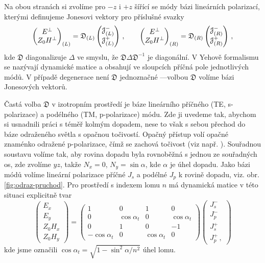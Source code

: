 Na obou stranách si zvolíme pro $-z$ i $+z$ šířící se módy bázi lineárních polarizací, kterými definujeme Jonesovi vektory pro příslušné svazky
\begin{equation}
    \begin{pmatrix} E^\perp \\ Z_0 H^\perp \end{pmatrix}_{(L)}=\mathfrak{D}_{(L)} \begin{pmatrix} \mathcal{J}^-_{(L)} \\ \mathcal{J}^+_{(L)} \end{pmatrix} \,, \qquad
    \begin{pmatrix} E^\perp \\ Z_0 H^\perp \end{pmatrix}_{(R)}=\mathfrak{D}_{(R)} \begin{pmatrix} \mathcal{J}^-_{(R)} \\ \mathcal{J}^+_{(R)} \end{pmatrix} \,,
\end{equation}
kde $\mathfrak{D}$ diagonalizuje $\Delta$ ve smyslu, že $\mathfrak{D}\Delta \mathfrak{D}^{-1}$ je diagonální.
V Yehově formalismu se nazývají dynamické matice a obsahují ve sloupcích příčná pole jednotlivých módů.
V případě degenerace není $\mathfrak{D}$ jednoznačné ---\tododash volbou $\mathfrak{D}$ volíme bázi Jonesových vektorů.

Častá volba $\mathfrak{D}$ v izotropním prostředí je báze lineárního příčného (TE, s-polarizace) a podélného (TM, p-polarizace) módu.
Zde ji uvedeme tak, abychom si usnadnili práci s téměř kolmým dopadem, nese to však s sebou přechod do báze odraženého světla s opačnou točivostí.
Opačný přístup volí opačné znaménko odražené p-polarizace, čímž se zachová točivost (viz např. ).
Souřadnou soustavu volíme tak, aby rovina dopadu byla rovnoběžná s jednou ze souřadných os, zde zvolíme $yz$, takže $N_x=0$, $N_y=\sin \alpha$, kde $\alpha$ je úhel dopadu.
Jako bázi módů volíme lineární polarizace příčné $J_s$ a podélné $J_p$ k rovině dopadu, viz. obr. \ref{fig:odraz-pruchod}.
Pro prostředí s indexem lomu $n$ má dynamická matice v této situaci explicitně tvar
\begin{equation}
    \begin{pmatrix} E_x \\ E_y \\ Z_0 H_x \\ Z_0 H_y \end{pmatrix}
    =\begin{pmatrix}
        1 & 0 & 1 & 0 \\
        0 & \cos\alpha_t & 0 & \cos\alpha_t \\
        0 & 1 & 0 & -1 \\
        -\cos\alpha_t & 0 & \cos\alpha_t & 0
    \end{pmatrix}
    \begin{pmatrix}
        J^-_{s} \\ J^-_{p} \\ J^+_s \\ J^+_{p} \,,
    \end{pmatrix}
\end{equation}
kde jsme označili $\cos \alpha_t = \sqrt{1-\sin^2 \alpha /n^2}$ úhel lomu.

